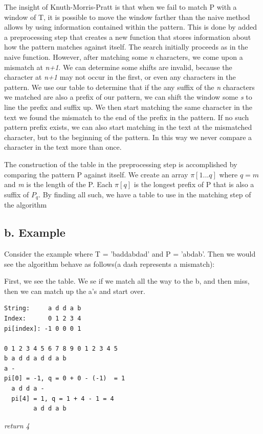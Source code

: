 \documentclass{chi2005}
\begin{document}
The insight of Knuth-Morris-Pratt \cite{KMP} is that when we fail to match P with a window of T, it is possible to move the window farther than the naive method allows by using information contained within the pattern. This is done by added a preprocessing step that creates a new function that stores information about how the pattern matches against itself. The search initially proceeds as in the naive function. However, after matching some \emph{n} characters, we come upon a mismatch at \emph{n+1}. We can determine some shifts are invalid, because the character at \emph{n+1} may not occur in the first, or even any characters in the pattern. We use our table to determine that if the any suffix of the \emph{n} characters we matched are also a prefix of our pattern, we can shift the window some \emph{s}  to line the prefix and suffix up. We then start matching  the same character in the text we found the mismatch to the end of the prefix in the pattern. If no such pattern prefix exists, we can also start matching in the text at the mismatched character, but to the beginning of the pattern. In this way we never compare a character in the text more than once.

The construction of the table in the preprocessing step is accomplished by comparing the pattern P against itself. We create an array $\pi[1...q]$ where $q=m$ and \emph{m} is the length of the P. Each $\pi[q]$ is the longest prefix of P that is also a suffix of $P_q$. By finding all such, we have a table to use in the matching step of the algorithm

\subsection{b. Example}

Consider the example where T = 'baddabdad' and P = 'abdab'. Then we would see the algorithm behave as follows(a dash represents a mismatch):

First, we see the table. We se if we match all the way to the b, and then miss, then we can match up the a's and start over.

\begin{verbatim}
String:     a d d a b
Index:      0 1 2 3 4
pi[index]: -1 0 0 0 1

0 1 2 3 4 5 6 7 8 9 0 1 2 3 4 5
b a d d a d d a b
a -
pi[0] = -1, q = 0 + 0 - (-1)  = 1
  a d d a -
  pi[4] = 1, q = 1 + 4 - 1 = 4
        a d d a b
\end{verbatim}

\emph{return 4}
\end{document}
